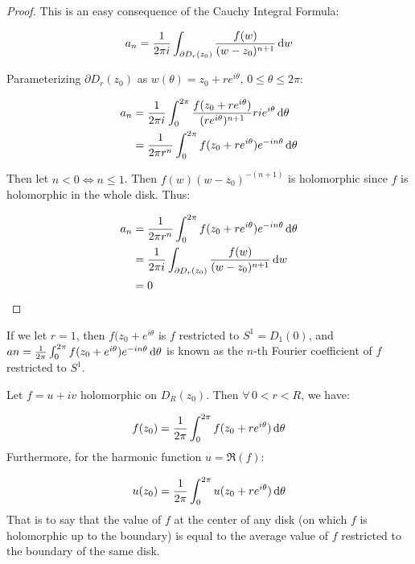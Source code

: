\begin{proof}
This is an easy consequence of the Cauchy Integral Formula:

\begin{align*}
    a_n = \frac{1}{2 \pi i} \int_{\partial D_r(z_0)} \frac{f(w)}{(w-z_0)^{n+1}} \dif w 
\end{align*}

Parameterizing $\partial D_r(z_0)$ as $w(\theta) = z_0 + re^{i \theta}, \, 0 \leq \theta \leq 2 \pi$:

\begin{align*}
    a_n &= \frac{1}{2 \pi i} \int_0^{2 \pi}  \frac{f(z_0+re^{i \theta  })}{(re^{i \theta})^{n+1}  } r i e^{i\theta} \dif \theta\\
    &= \frac{1}{2 \pi r^n} \int_0^{2 \pi} f(z_0+re^{i \theta} ) e^{-i n \theta} \dif \theta
\end{align*}



Then let $n<0 \Leftrightarrow n \leq 1$. Then $f(w)(w-z_0)^{-(n+1)}$ is holomorphic since $f$ is holomorphic in the whole disk. Thus:

\begin{align*}
    a_n &= \frac{1}{2 \pi r^n} \int_0^{2 \pi} f(z_0+re^{i \theta} ) e^{-i n \theta} \dif \theta\\ &= \frac{1}{2 \pi i} \int_{\partial D_r(z_0)} \frac{f(w)}{(w-z_0)^{n+1}} \dif w\\
    &= 0
\end{align*}


\end{proof}

\begin{note}
If we let $r=1$, then $f(z_0 + e^{i \theta}$ is $f$ restricted to $S^1 = D_1(0)$, and $an = \frac{1}{2 \pi } \int_0^{2 \pi} f(z_0+e^{i \theta} ) e^{-i n \theta} \dif \theta$ is known as the $n$-th Fourier coefficient of $f$ restricted to $S^1$.
\end{note}

\begin{corollary}

Let $f=u+iv$ holomorphic on $D_R(z_0)$. Then $\forall \, 0 < r < R$, we have:

\begin{align*}
    f(z_0) &= \frac{1}{2 \pi} \int_0^{2 \pi} f( z_0 + r e^{i \theta} ) \dif \theta\\
\end{align*}
Furthermore, for the harmonic function $u = \Re (f)$:


\begin{align*}
    u(z_0) &= \frac{1}{2 \pi} \int_0^{2 \pi} u( z_0 + r e^{i \theta} ) \dif \theta\\
\end{align*}
That is to say that the value of $f$ at the center of any disk (on which $f$ is holomorphic up to the boundary) is equal to the average value of $f$ restricted to the boundary of the same disk.
\end{corollary}

